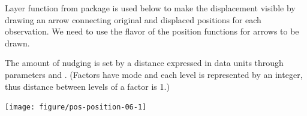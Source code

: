 \documentclass[krantz2]{krantz}\usepackage{knitr}
\begin{document}
Layer function  from package  is used below to make the displacement visible by drawing an arrow connecting original and displaced positions for each observation. We need to use the  flavor of the position functions for arrows to be drawn.

\begin{knitrout}\footnotesize
{}\color{fgcolor}\begin{kframe}
\begin{alltt}
 \hlkwb{<-}
  \hlstd{(} 
          \hlstd{=} \hlstd{(} \hlstd{=}    \hlopt{+}
  \hlstd{(} \hlstd{=} \hlstd{)}
 \hlkwb{<-}  \hlopt{+}
  \hlstd{(} \hlstd{=} \hlstd{(} \hlstd{=} \hlstd{,}  \hlstd{=} \hlstd{),}
                \hlstd{=} \hlstd{)} \hlopt{+}
  \hlstd{(}\hlstd{)}
\end{alltt}
\end{kframe}
\end{knitrout}

The amount of nudging is set by a distance expressed in data units through parameters  and . (Factors have mode  and each level is represented by an integer, thus distance between levels of a factor is 1.)

\begin{knitrout}\footnotesize
{}\color{fgcolor}\begin{kframe}
\begin{alltt}
 \hlkwb{<-}  \hlopt{+}
  \hlstd{(} \hlstd{=} \hlstd{(} \hlstd{=} \hlstd{,}  \hlstd{=} \hlstd{),}
                \hlstd{=} \hlstd{)} \hlopt{+}
  \hlstd{(}\hlstd{)}
\end{alltt}
\end{kframe}
\end{knitrout}

\begin{knitrout}\footnotesize
{}\color{fgcolor}\begin{kframe}
\begin{alltt}
 \hlopt{+} 
\end{alltt}
\end{kframe}

{\centering \texttt{[image: figure/pos-position-06-1]} 

}


\end{knitrout}
\end{document}
